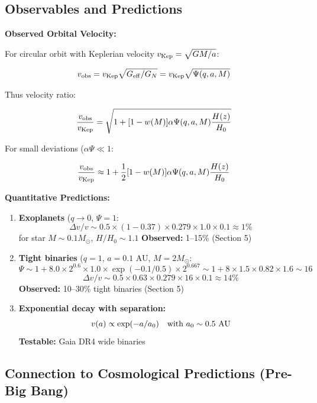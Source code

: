 \documentclass[11pt,a4paper]{article}
\begin{document}
\hypertarget{observables-and-predictions}{%
\subsection{Observables and
Predictions}\label{observables-and-predictions}}

\textbf{Observed Orbital Velocity:}

For circular orbit with Keplerian velocity
\(v_{\rm Kep} = \sqrt{GM/a}\):

\[v_{\rm obs} = v_{\rm Kep} \sqrt{G_{\rm eff}/G_N} = v_{\rm Kep} \sqrt{\Psi(q,a,M)}\]

Thus velocity ratio:

\[\frac{v_{\rm obs}}{v_{\rm Kep}} = \sqrt{1 + [1-w(M)] \alpha \Psi(q,a,M) \frac{H(z)}{H_0}}\]

For small deviations (\(\alpha \Psi \ll 1\):

\[\frac{v_{\rm obs}}{v_{\rm Kep}} \approx 1 + \frac{1}{2}[1-w(M)] \alpha \Psi(q,a,M) \frac{H(z)}{H_0}\]

\textbf{Quantitative Predictions:}

\begin{enumerate}
\def\labelenumi{\arabic{enumi}.}
\item
  \textbf{Exoplanets} (\(q \to 0\), \(\Psi = 1\):
  \[\Delta v/v \sim 0.5 \times (1-0.37) \times 0.279 \times 1.0 \times 0.1 \approx 1\%\]
  for star \(M \sim 0.1 M_\odot\), \(H/H_0 \sim 1.1\) \textbf{Observed:}
  1--15\% \checkmark{} (Section 5)
\item
  \textbf{Tight binaries} (\(q=1\), \(a=0.1\) AU, \(M=2 M_\odot\):
  \[\Psi \sim 1 + 8.0 \times 2^{0.6} \times 1.0 \times \exp(-0.1/0.5) \times 2^{0.667} \sim 1 + 8 \times 1.5 \times 0.82 \times 1.6 \sim 16\]
  \[\Delta v/v \sim 0.5 \times 0.63 \times 0.279 \times 16 \times 0.1 \approx 14\%\]
  \textbf{Observed:} 10--30\% tight binaries \checkmark{} (Section 5)
\item
  \textbf{Exponential decay with separation:}
  \[v(a) \propto \exp(-a/a_0) \quad \text{with } a_0 \sim 0.5~{\rm AU}\]
  \textbf{Testable:} Gaia DR4 wide binaries \checkmark{}
\end{enumerate}

\hypertarget{connection-to-cosmological-predictions-pre-big-bang}{%
\subsection{Connection to Cosmological Predictions (Pre-Big
Bang)}\label{connection-to-cosmological-predictions-pre-big-bang}}
\end{document}
